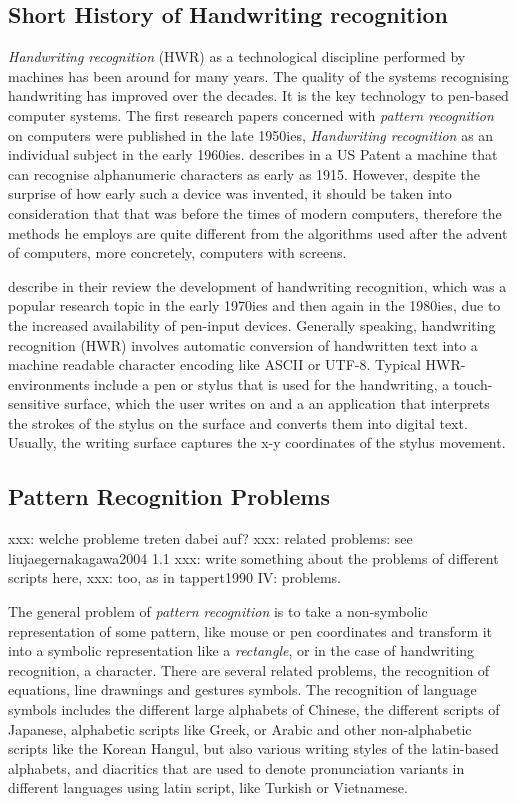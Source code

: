\subsection{Short History of Handwriting recognition}
\label{sec:shorthistoryofhwr}

\emph{Handwriting recognition} (HWR) as a technological discipline performed 
by machines has been around for many years. The quality of the systems 
recognising handwriting has improved over the decades. It is the key 
technology to pen-based computer systems. The first research papers 
concerned with \emph{pattern recognition} on computers were published 
in the late 1950ies, \emph{Handwriting recognition} as an individual subject in 
the early 1960ies.  describes in a US Patent
a machine that can recognise alphanumeric characters as early as 1915. 
However, despite the surprise of how early such a device was invented,
it should be taken into consideration that that was before the times 
of modern computers, therefore the methods he employs are quite different 
from the algorithms used after the advent of computers, more concretely, 
computers with screens. 

 describe in their review the development of 
handwriting recognition, which was a popular research topic in the early 
1970ies and then again in the 1980ies, due to the increased availability 
of pen-input devices.  Generally speaking, handwriting recognition (HWR) 
involves automatic conversion of handwritten text into a machine readable 
character encoding like ASCII or UTF-8. Typical HWR-environments include 
a pen or stylus that is used for the handwriting, a touch-sensitive surface, 
which the user writes on and a an application that interprets the strokes 
of the stylus on the surface and converts them into digital text. 
Usually, the writing surface captures the x-y coordinates of the stylus 
movement.

\subsection{Pattern Recognition Problems}
\label{sec:patternrecognitionproblems}

xxx: welche probleme treten dabei auf?
xxx: related problems: see liujaegernakagawa2004 1.1
xxx: write something about the problems of different scripts here, 
xxx: too, as in tappert1990 IV: problems.

The general problem of \emph{pattern recognition} is to take a non-symbolic 
representation of some pattern, like mouse or pen coordinates and transform
it into a symbolic representation like a \emph{rectangle}, or in the case of 
handwriting recognition, a character. There are several related problems,
the recognition of equations, line drawnings and gestures symbols.
The recognition of language symbols includes the different large alphabets of
Chinese, the different scripts of Japanese, alphabetic scripts like Greek, 
or Arabic and other non-alphabetic scripts like the Korean  Hangul,
but also various writing styles of the latin-based alphabets,
and diacritics that are used to denote pronunciation variants in different
languages using latin script, like Turkish or Vietnamese.

